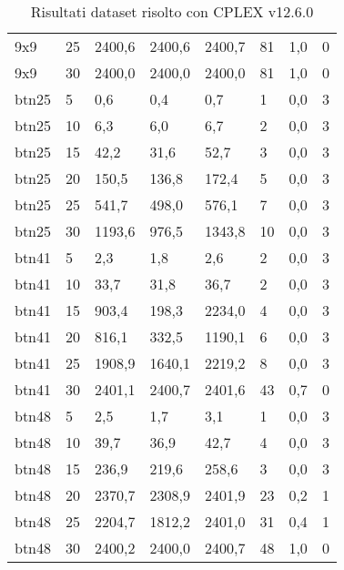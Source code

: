 \begin{table}[]
\begin{tabular}{@{}llllllll@{}}
		9x9     & 25            & 2400,6        & 2400,6      & 2400,7      & 81         & 1,0     & 0          \\
		9x9     & 30            & 2400,0        & 2400,0      & 2400,0      & 81         & 1,0     & 0          \\
		btn25   & 5             & 0,6           & 0,4         & 0,7         & 1          & 0,0     & 3          \\
		btn25   & 10            & 6,3           & 6,0         & 6,7         & 2          & 0,0     & 3          \\
		btn25   & 15            & 42,2          & 31,6        & 52,7        & 3          & 0,0     & 3          \\
		btn25   & 20            & 150,5         & 136,8       & 172,4       & 5          & 0,0     & 3          \\
		btn25   & 25            & 541,7         & 498,0       & 576,1       & 7          & 0,0     & 3          \\
		btn25   & 30            & 1193,6        & 976,5       & 1343,8      & 10         & 0,0     & 3          \\
		btn41   & 5             & 2,3           & 1,8         & 2,6         & 2          & 0,0     & 3          \\
		btn41   & 10            & 33,7          & 31,8        & 36,7        & 2          & 0,0     & 3          \\
		btn41   & 15            & 903,4         & 198,3       & 2234,0      & 4          & 0,0     & 3          \\
		btn41   & 20            & 816,1         & 332,5       & 1190,1      & 6          & 0,0     & 3          \\
		btn41   & 25            & 1908,9        & 1640,1      & 2219,2      & 8          & 0,0     & 3          \\
		btn41   & 30            & 2401,1        & 2400,7      & 2401,6      & 43         & 0,7     & 0          \\
		btn48   & 5             & 2,5           & 1,7         & 3,1         & 1          & 0,0     & 3          \\
		btn48   & 10            & 39,7          & 36,9        & 42,7        & 4          & 0,0     & 3          \\
		btn48   & 15            & 236,9         & 219,6       & 258,6       & 3          & 0,0     & 3          \\
		btn48   & 20            & 2370,7        & 2308,9      & 2401,9      & 23         & 0,2     & 1          \\
		btn48   & 25            & 2204,7        & 1812,2      & 2401,0      & 31         & 0,4     & 1          \\
		btn48   & 30            & 2400,2        & 2400,0      & 2400,7      & 48         & 1,0     & 0          \\ \bottomrule
	\end{tabular}
	\caption{Risultati dataset risolto con CPLEX v12.6.0}
	\label{tab:esatto}
\end{table}
%

